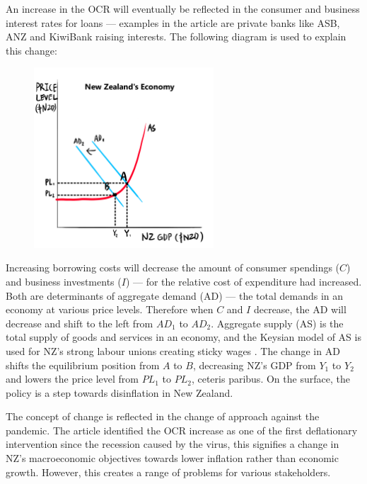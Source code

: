 \documentclass[a4paper,12pt]{article}
\begin{document}
An increase in the OCR will eventually be reflected in the consumer and business interest rates for loans --- examples in the article are private banks like ASB, ANZ and KiwiBank raising interests. The following diagram is used to explain this change:

\begin{figure}[H]
    \centering
    \includegraphics[width=0.6\textwidth]{assets/macro.png}
\end{figure}

Increasing borrowing costs will decrease the amount of consumer spendings ($C$) and business investments ($I$) --- for the relative cost of expenditure had increased. Both are determinants of aggregate demand (AD) --- the total demands in an economy at various price levels. Therefore when $C$ and $I$ decrease, the AD will decrease and shift to the left from $AD_1$ to $AD_2$. Aggregate supply (AS) is the total supply of goods and services in an economy, and the Keysian model of AS is used for NZ's strong labour unions creating sticky wages \parencite{labor}. The change in AD shifts the equilibrium position from $A$ to $B$, decreasing NZ's GDP from $Y_1$ to $Y_2$ and lowers the price level from $PL_1$ to $PL_2$, ceteris paribus. On the surface, the policy is a step towards disinflation in New Zealand.

The concept of change is reflected in the change of approach against the pandemic. The article identified the OCR increase as one of the first deflationary intervention since the recession caused by the virus, this signifies a change in NZ's macroeconomic objectives towards lower inflation rather than economic growth. However, this creates a range of problems for various stakeholders.
\end{document}
